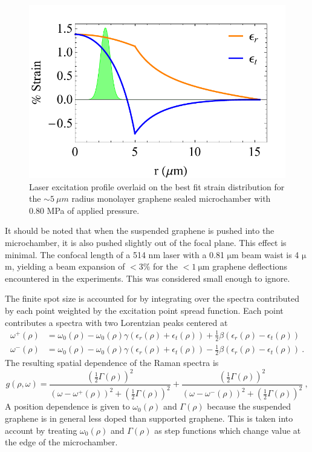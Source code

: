\begin{figure}
	\begin{center}
	\includegraphics{Figs_Fit/SB02-1_StrainWithLaser.pdf}
	\caption[Laser excitation profile overlaid on strain distribution]{\label{Fig:Fit:FiniteSpot}
	Laser excitation profile overlaid on the best fit strain distribution for the $\sim 5 \ \mu m$ radius monolayer graphene sealed microchamber with 0.80 MPa of applied pressure.
	}
	\end{center}
\end{figure}

It should be noted that when the suspended graphene is pushed into the microchamber, it is also pushed slightly out of the focal plane.
This effect is minimal.
The confocal length of a 514 nm laser with a 0.81 $\mathrm{\mu}$m beam waist is 4 $\mathrm{\mu}$m, yielding a beam expansion of $<3\%$ for the $<1 \ \mathrm{\mu m}$ graphene deflections encountered in the experiments.
This was considered small enough to ignore.

The finite spot size is accounted for by integrating over the spectra contributed by each point weighted by the excitation point spread function.
Each point contributes a spectra with two Lorentzian peaks centered at
\begin{align*}
	\omega^+ (\rho)&=\omega_0(\rho)-\omega_0(\rho) \gamma(\epsilon_{r}(\rho)+\epsilon_{t}(\rho)) 
		+ \frac{1}{2} \beta (\epsilon_{r}(\rho)-\epsilon_{t}(\rho)) \\
	\omega^-(\rho)&=\omega_0(\rho)-\omega_0(\rho) \gamma(\epsilon_{r}(\rho)+\epsilon_{t}(\rho))
		- \frac{1}{2} \beta (\epsilon_{r}(\rho)-\epsilon_{t}(\rho)) \ .
\end{align*}
The resulting spatial dependence of the Raman spectra is
\begin{equation*}
	g(\rho,\omega)=
	\frac{\left(\frac{1}{2} \Gamma(\rho) \right)^2}
	{\left(\omega-\omega^+(\rho) \right)^2+\left(\frac{1}{2} \Gamma(\rho) \right)^2}+
	\frac{\left(\frac{1}{2} \Gamma(\rho) \right)^2}
	{\left(\omega-\omega^-(\rho) \right)^2+\left(\frac{1}{2} \Gamma(\rho) \right)^2} \ ,
\end{equation*}
A position dependence is given to $\omega_0(\rho)$ and $\Gamma(\rho)$ because the suspended graphene is in general less doped than supported graphene.
This is taken into account by treating $\omega_0(\rho)$ and $\Gamma(\rho)$ as step functions which change value at the edge of the microchamber.

